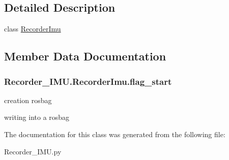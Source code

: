 \subsection{Detailed Description}
class \hyperlink{classRecorder__IMU_1_1RecorderImu}{Recorder\+Imu} 

\subsection{Member Data Documentation}
\subsubsection[{\texorpdfstring{flag\+\_\+start}{flag_start}}]{\setlength{\rightskip}{0pt plus 5cm}Recorder\+\_\+\+I\+M\+U.\+Recorder\+Imu.\+flag\+\_\+start}\hypertarget{classRecorder__IMU_1_1RecorderImu_a40c4018904a7166e3bce05b6d84877c2}{}\label{classRecorder__IMU_1_1RecorderImu_a40c4018904a7166e3bce05b6d84877c2}


creation rosbag 

writing into a rosbag 

The documentation for this class was generated from the following file\+:\begin{DoxyCompactItemize}
\item 
Recorder\+\_\+\+I\+M\+U.\+py\end{DoxyCompactItemize}
